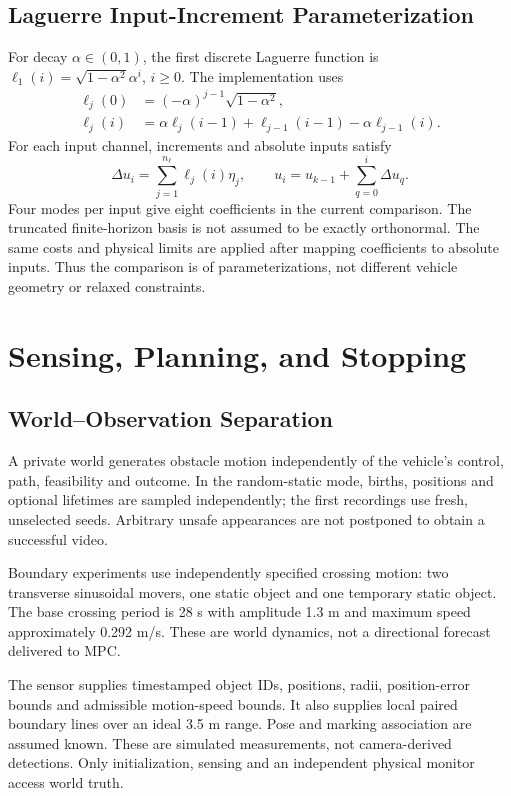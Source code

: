 \documentclass[conference]{IEEEtran}
\begin{document}
\subsection{Laguerre Input-Increment Parameterization}
For decay $\alpha\in(0,1)$, the first discrete Laguerre function is
$\ell_1(i)=\sqrt{1-\alpha^2}\alpha^i$, $i\geq0$. The implementation uses
\begin{align}
\ell_j(0)&=(-\alpha)^{j-1}\sqrt{1-\alpha^2},\\
\ell_j(i)&=\alpha\ell_j(i-1)+\ell_{j-1}(i-1)-\alpha\ell_{j-1}(i).
\end{align}
For each input channel, increments and absolute inputs satisfy
\begin{equation}
\Delta u_i=\sum_{j=1}^{n_\ell}\ell_j(i)\eta_j,\qquad
u_i=u_{k-1}+\sum_{q=0}^{i}\Delta u_q.
\end{equation}
Four modes per input give eight coefficients in the current comparison.
The truncated finite-horizon basis is not assumed to be exactly orthonormal.
The same costs and physical limits are applied after mapping coefficients
to absolute inputs. Thus the comparison is of parameterizations, not
different vehicle geometry or relaxed constraints.

\section{Sensing, Planning, and Stopping}
\subsection{World--Observation Separation}
A private world generates obstacle motion independently of the vehicle's
control, path, feasibility and outcome. In the random-static mode, births,
positions and optional lifetimes are sampled independently; the first
recordings use fresh, unselected seeds. Arbitrary unsafe appearances are not
postponed to obtain a successful video.

Boundary experiments use independently specified crossing motion: two
transverse sinusoidal movers, one static object and one temporary static
object. The base crossing period is 28 s with amplitude 1.3 m and maximum
speed approximately 0.292 m/s. These are world dynamics, not a directional
forecast delivered to MPC.

The sensor supplies timestamped object IDs, positions, radii, position-error
bounds and admissible motion-speed bounds. It also supplies local paired
boundary lines over an ideal 3.5 m range. Pose and marking association are
assumed known. These are simulated measurements, not camera-derived detections.
Only initialization, sensing and an independent physical monitor access
world truth.
\end{document}
